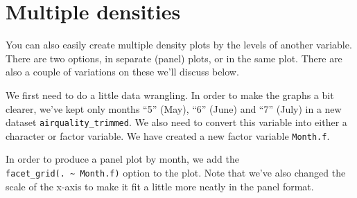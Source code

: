 \section{Multiple densities}\label{multiple-densities}

You can also easily create multiple density plots by the levels of
another variable. There are two options, in separate (panel) plots, or
in the same plot. There are also a couple of variations on these we'll
discuss below.

We first need to do a little data wrangling. In order to make the graphs
a bit clearer, we've kept only months ``5'' (May), ``6'' (June) and
``7'' (July) in a new dataset \texttt{airquality\_trimmed}. We also need
to convert this variable into either a character or factor variable. We
have created a new factor variable \texttt{Month.f}.

In order to produce a panel plot by month, we add the
\texttt{facet\_grid(.\ \textasciitilde{}\ Month.f)} option to the plot.
Note that we've also changed the scale of the x-axis to make it fit a
little more neatly in the panel format.

